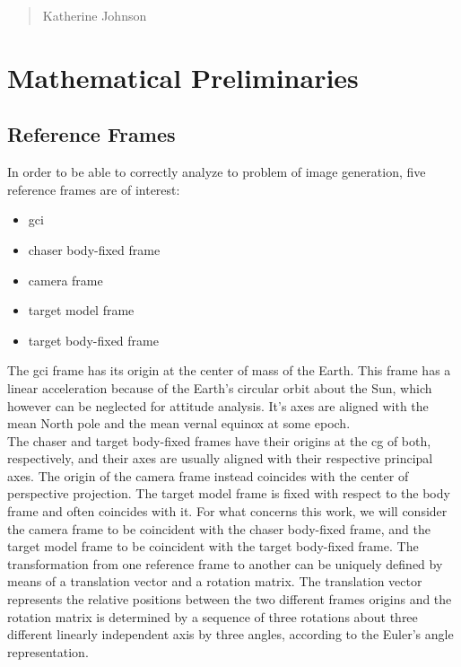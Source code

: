 \begin{quotation}
  {\footnotesize
    \begin{flushright}
      Katherine Johnson
    \end{flushright}
  }
\end{quotation}
\vspace{0.5cm}

\section{Mathematical Preliminaries}

\subsection{Reference Frames}
In order to be able to correctly analyze to problem of image generation, five reference frames are of interest:
\begin{itemize}
  \item \acrfull{gci}
  \item chaser body-fixed frame
  \item camera frame
  \item target model frame
  \item target body-fixed frame
\end{itemize}

The \acrshort{gci} frame has its origin at the center of mass of the Earth. This frame has a linear acceleration because of the Earth's circular orbit about the Sun, which however can be neglected for attitude analysis.
It's axes are aligned with the mean North pole and the mean vernal equinox at some epoch.\\
The chaser and target body-fixed frames have their origins at the \acrshort{cg} of both, respectively, and their axes are usually aligned with their respective principal axes.
The origin of the camera frame instead coincides with the center of perspective projection.
The target model frame is fixed with respect to the body frame and often coincides with it.
For what concerns this work, we will consider the camera frame to be coincident with the chaser body-fixed frame, and the target model frame to be coincident with the target body-fixed frame.
The transformation from one reference frame to another can be uniquely defined by means of a translation vector and a rotation matrix. The translation vector represents the relative positions between the two different frames origins and the rotation matrix is determined by a sequence of three rotations about three different linearly independent axis by three angles, according to the Euler's angle representation.

